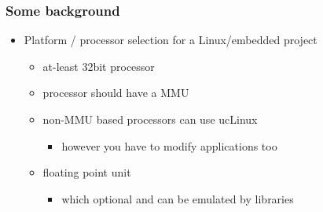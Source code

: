 \documentclass[11pt]{beamer}
\begin{document}
\begin{frame}[fragile]\frametitle{Some background}
\label{sec-3.1}

\begin{itemize}

\item Platform / processor selection for a Linux/embedded project\\
\label{sec-3.1.1}

\begin{itemize}

\item at-least 32bit processor\\
\label{sec-3.1.1.1}


\item processor should have a MMU\\
\label{sec-3.1.1.2}


\item non-MMU based processors can use ucLinux\\
\label{sec-3.1.1.3}

\begin{itemize}

\item however you have to modify applications too\\
\label{sec-3.1.1.3.1}

\end{itemize} %

\item floating point unit\\
\label{sec-3.1.1.4}

\begin{itemize}

\item which optional and can be emulated by libraries\\
\label{sec-3.1.1.4.1}


\end{itemize} %
\end{itemize} %
\end{itemize} %
\end{frame}
\end{document}
